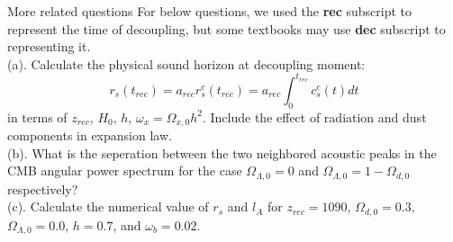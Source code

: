 \clearpage
\begin{example}{More related questions}{}
    For below questions, we used the \textbf{rec} subscript to represent the time of decoupling, but some textbooks may use \textbf{dec} subscript to representing it. \\
    (a). Calculate the physical sound horizon at decoupling moment:
    \[
        r_s(t_{rec}) = a_{rec} r_s^c(t_{rec}) = a_{rec} \int_0^{t_{rec}} c_s^c(t) dt
    \]
    in terms of $z_{rec}$, $H_0$, $h$, $\omega_x = \Omega_{x,0} h^2$. Include the effect of radiation and dust components in expansion law. \\
    (b). What is the seperation between the two neighbored acoustic peaks in the CMB angular power spectrum for the case $\Omega_{\Lambda,0} = 0$ and $\Omega_{\Lambda,0} = 1 - \Omega_{d,0}$ respectively? \\
    (c). Calculate the numerical value of $r_s$ and $l_A$ for $z_{rec} = 1090$, $\Omega_{d,0} = 0.3$, $\Omega_{\Lambda,0} = 0.0$, $h = 0.7$, and $\omega_b = 0.02$.


\end{example}
